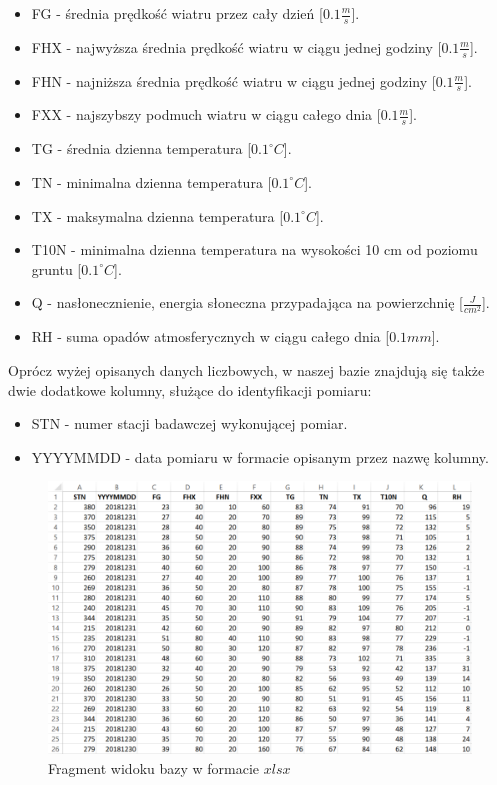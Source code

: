 \documentclass{classrep}
\begin{document}
\begin{itemize}[label=$\bullet$\scshape\bfseries]
\item FG - średnia prędkość wiatru przez cały dzień [$0.1 \frac{m}{s}$].
\item FHX - najwyższa średnia prędkość wiatru w ciągu jednej godziny [$0.1 \frac{m}{s}$].
\item FHN - najniższa średnia prędkość wiatru w ciągu jednej godziny [$0.1 \frac{m}{s}$].
\item FXX - najszybszy podmuch wiatru w ciągu całego dnia [$0.1 \frac{m}{s}$].
\item TG - średnia dzienna temperatura [$0.1^{\circ} C$].
\item TN - minimalna dzienna temperatura [$0.1^{\circ} C$].
\item TX - maksymalna dzienna temperatura [$0.1^{\circ} C$].
\item T10N - minimalna dzienna temperatura na wysokości 10 cm od poziomu gruntu [$0.1^{\circ} C$].
\item Q - nasłonecznienie, energia słoneczna przypadająca na powierzchnię [$\frac{J}{cm^2}$].
\item RH - suma opadów atmosferycznych w ciągu całego dnia [$0.1 mm$].\newline
\end{itemize}

Oprócz wyżej opisanych danych liczbowych, w naszej bazie znajdują się także dwie dodatkowe kolumny, służące do identyfikacji pomiaru:
\begin{itemize}[label=$\bullet$\scshape\bfseries]
\item STN - numer stacji badawczej wykonującej pomiar.
\item YYYYMMDD - data pomiaru w formacie opisanym przez nazwę kolumny.
\end{itemize}

\begin{figure}[H]
	\centering
	\includegraphics[width=1\textwidth]{Pictures/baza.png}
	\caption{Fragment widoku bazy w formacie $xlsx$}
\end{figure}
\end{document}
